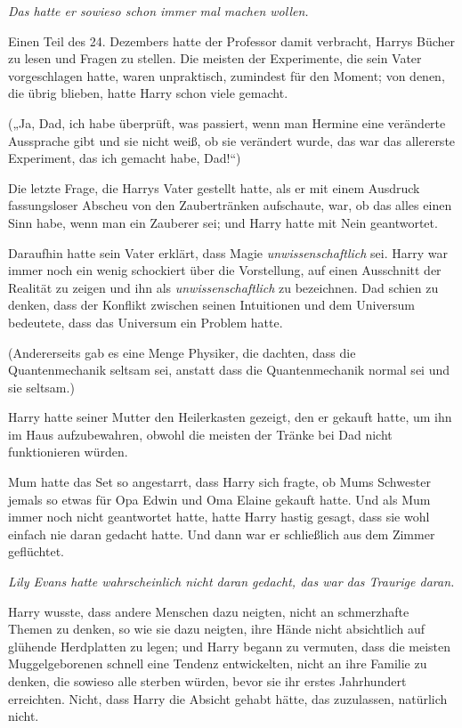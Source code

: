 {\emph{Das hatte er sowieso schon immer mal machen wollen.}

Einen Teil des 24. Dezembers hatte der Professor damit verbracht, Harrys Bücher zu lesen und Fragen zu stellen. Die meisten der Experimente, die sein Vater vorgeschlagen hatte, waren unpraktisch, zumindest für den Moment; von denen, die übrig blieben, hatte Harry schon viele gemacht.

(„Ja, Dad, ich habe überprüft, was passiert, wenn man Hermine eine veränderte Aussprache gibt und sie nicht weiß, ob sie verändert wurde, das war das allererste Experiment, das ich gemacht habe, Dad!“)

Die letzte Frage, die Harrys Vater gestellt hatte, als er mit einem Ausdruck fassungsloser Abscheu von den Zaubertränken aufschaute, war, ob das alles einen Sinn habe, wenn man ein Zauberer sei; und Harry hatte mit Nein geantwortet.

Daraufhin hatte sein Vater erklärt, dass Magie \emph{unwissenschaftlich} sei. Harry war immer noch ein wenig schockiert über die Vorstellung, auf einen Ausschnitt der Realität zu zeigen und ihn als \emph{unwissenschaftlich} zu bezeichnen. Dad schien zu denken, dass der Konflikt zwischen seinen Intuitionen und dem Universum bedeutete, dass das Universum ein Problem hatte.

(Andererseits gab es eine Menge Physiker, die dachten, dass die Quantenmechanik seltsam sei, anstatt dass die Quantenmechanik normal sei und sie seltsam.)

Harry hatte seiner Mutter den Heilerkasten gezeigt, den er gekauft hatte, um ihn im Haus aufzubewahren, obwohl die meisten der Tränke bei Dad nicht funktionieren würden.

Mum hatte das Set so angestarrt, dass Harry sich fragte, ob Mums Schwester jemals so etwas für Opa Edwin und Oma Elaine gekauft hatte. Und als Mum immer noch nicht geantwortet hatte, hatte Harry hastig gesagt, dass sie wohl einfach nie daran gedacht hatte. Und dann war er schließlich aus dem Zimmer geflüchtet.

\emph{Lily Evans hatte wahrscheinlich nicht daran gedacht, das war das Traurige daran.}

Harry wusste, dass andere Menschen dazu neigten, nicht an schmerzhafte Themen zu denken, so wie sie dazu neigten, ihre Hände nicht absichtlich auf glühende Herdplatten zu legen; und Harry begann zu vermuten, dass die meisten Muggelgeborenen schnell eine Tendenz entwickelten, nicht an ihre Familie zu denken, die sowieso alle sterben würden, bevor sie ihr erstes Jahrhundert erreichten. Nicht, dass Harry die Absicht gehabt hätte, das zuzulassen, natürlich nicht.

}
